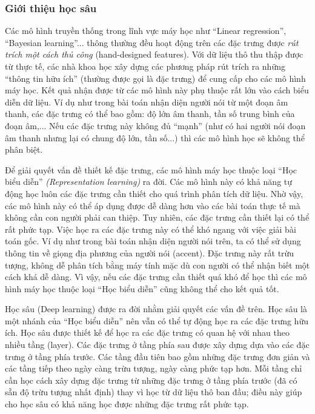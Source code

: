 \subsubsection*{Giới thiệu học sâu}
	Các mô hình truyền thống trong lĩnh vực máy học như ``Linear regression'', ``Bayesian learning''... thông thường đều hoạt động trên các đặc trưng được \textit{rút trích một cách thủ công} (hand-designed features).
	Với dữ liệu thô thu thập được từ thực tế, các nhà khoa học xây dựng các phương pháp rút trích ra những ``thông tin hữu ích'' (thường được gọi là đặc trưng) để cung cấp cho các mô hình máy học.
	Kết quả nhận được từ các mô hình này phụ thuộc rất lớn vào cách biểu diễn dữ liệu.
	Ví dụ như trong bài toán nhận diện người nói từ một đoạn âm thanh, các đặc trưng có thể bao gồm: độ lớn âm thanh, tần số trung bình của đoạn âm,...
	Nếu các đặc trưng này không đủ ``mạnh'' (như có hai người nói đoạn âm thanh nhưng lại có chung độ lớn, tần số...) thì các mô hình học sẽ không thể phân biệt.
		
	Để giải quyết vấn đề thiết kế đặc trưng, các mô hình máy học thuộc loại ``Học biểu diễn'' \textit{(Representation learning)} ra đời.
	Các mô hình này có khả năng tự động học luôn các đặc trưng cần thiết cho quá trình phân tích dữ liệu.
	Nhờ vậy, các mô hình này có thể áp dụng được dễ dàng hơn vào các bài toán thực tế mà không cần con người phải can thiệp.
	Tuy nhiên, các đặc trưng cần thiết lại có thể rất phức tạp.
	Việc học ra các đặc trưng này có thể khó ngang với việc giải bài toán gốc.
	Ví dụ như trong bài toán nhận diện người nói trên, ta có thể sử dụng thông tin về giọng địa phương của người nói (accent).
	Đặc trưng này rất trừu tượng, không dễ phân tích bằng máy tính mặc dù con người có thể nhận biết một cách khá dễ dàng.
	Vì vậy, nếu các đặc trưng cần thiết quá khó để học thì các mô hình máy học thuộc loại ``Học biểu diễn'' cũng không thể cho kết quả tốt.

	Học sâu (Deep learning) được ra đời nhằm giải quyết các vấn đề trên.
	Học sâu là một nhánh của ``Học biểu diễn'' nên vẫn có thể tự động học ra các đặc trưng hữu ích.
	Học sâu được thiết kế để học ra các đặc trưng có quan hệ với nhau theo nhiều tầng (layer).
	Các đặc trưng ở tầng phía sau được xây dựng dựa vào các đặc trưng ở tầng phía trước.
	Các tầng đầu tiên bao gồm những đặc trưng đơn giản và các tầng tiếp theo ngày càng trừu tượng, ngày càng phức tạp hơn.
	Mỗi tầng chỉ cần học cách xây dựng đặc trưng từ những đặc trưng ở tầng phía trước (đã có sẵn độ trừu tượng nhất định) thay vì học từ dữ liệu thô ban đầu; điều này giúp cho học sâu có khả năng học được những đặc trưng rất phức tạp.
	
